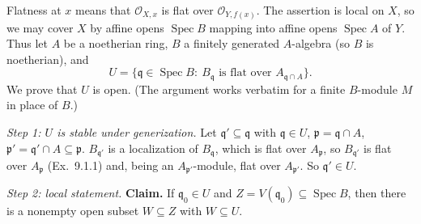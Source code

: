 \documentclass[11pt]{article}
\begin{document}
\pf
Flatness at $x$ means that $\mathcal O_{X,x}$ is flat over $\mathcal O_{Y,f(x)}$. The assertion is local on $X$, so we may cover $X$ by affine opens $\operatorname{Spec}B$ mapping into affine opens $\operatorname{Spec}A$ of $Y$. Thus let $A$ be a noetherian ring, $B$ a finitely generated $A$-algebra (so $B$ is noetherian), and
\[
U=\{\mathfrak q\in\operatorname{Spec}B:\ B_{\mathfrak q}\text{ is flat over }A_{\mathfrak q\cap A}\}.
\]
We prove that $U$ is open. (The argument works verbatim for a finite $B$-module $M$ in place of $B$.)

\emph{Step 1: $U$ is stable under generization.} Let $\mathfrak q'\subseteq\mathfrak q$ with $\mathfrak q\in U$, $\mathfrak p=\mathfrak q\cap A$, $\mathfrak p'=\mathfrak q'\cap A\subseteq\mathfrak p$. $B_{\mathfrak q'}$ is a localization of $B_{\mathfrak q}$, which is flat over $A_{\mathfrak p}$, so $B_{\mathfrak q'}$ is flat over $A_{\mathfrak p}$ (Ex.~9.1.1) and, being an $A_{\mathfrak p'}$-module, flat over $A_{\mathfrak p'}$. So $\mathfrak q'\in U$.

\emph{Step 2: local statement.} \textbf{Claim.} If $\mathfrak q_0\in U$ and $Z=V(\mathfrak q_0)\subseteq\operatorname{Spec}B$, then there is a nonempty open subset $W\subseteq Z$ with $W\subseteq U$.
\end{document}
